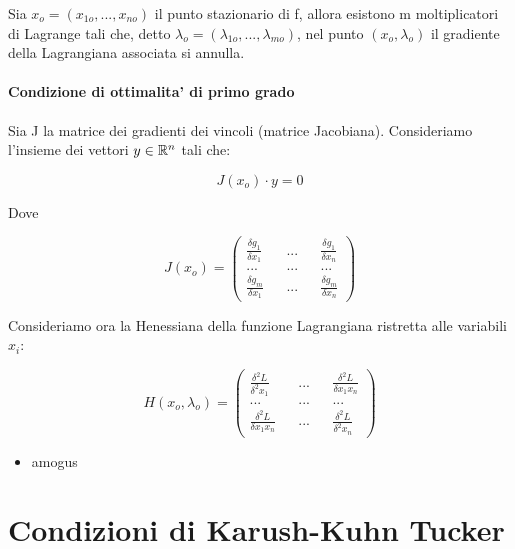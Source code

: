 Sia $x_o = (x_{1o},...,x_{no})$ il punto stazionario di f, allora esistono m moltiplicatori di Lagrange tali che, detto $\lambda_o = (\lambda_{1o},...,\lambda_{mo})$, nel punto $(x_o,\lambda_o)$ il gradiente della Lagrangiana associata si annulla.

\paragraph{Condizione di ottimalita' di primo grado}

Sia J la matrice dei gradienti dei vincoli (matrice Jacobiana).
Consideriamo l'insieme dei vettori $y \in \mathbb{R}^n$ tali che:

\[ J(x_o) \cdot y = 0 \]

Dove

\[
    J(x_o) =
    \begin{pmatrix}
        \frac {\delta g_1} {\delta x_1} && ... && \frac {\delta g_1} {\delta x_n} \\
        ... && ... && ... \\
        \frac {\delta g_m} {\delta x_1} && ... && \frac {\delta g_m} {\delta x_n}
    \end{pmatrix}
\]

Consideriamo ora la Henessiana della funzione Lagrangiana ristretta alle variabili $x_i$:

\[
    H(x_o, \lambda_o) =
    \begin{pmatrix}
        \frac {\delta^2 L} {\delta^2 x_1} && ... && \frac {\delta^2 L} {\delta x_1 x_n} \\
        ... && ... && ... \\
        \frac {\delta^2 L} {\delta x_1 x_n} && ... && \frac {\delta^2 L} {\delta^2 x_n}
    \end{pmatrix}
\]

\begin{itemize}
        \item amogus
\end{itemize}

\section{Condizioni di Karush-Kuhn Tucker}


